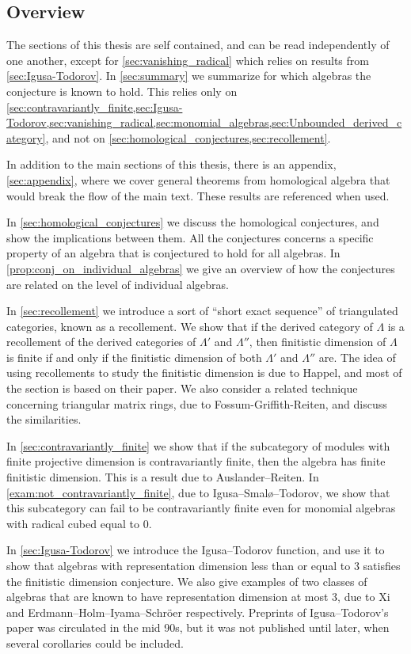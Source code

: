 \subsection*{Overview}
The sections of this thesis are self contained, and can be read independently of one another, except for \cref{sec:vanishing_radical} which relies on results from \cref{sec:Igusa-Todorov}. In \cref{sec:summary} we summarize for which algebras the conjecture is known to hold. This relies only on \cref{sec:contravariantly_finite,sec:Igusa-Todorov,sec:vanishing_radical,sec:monomial_algebras,sec:Unbounded_derived_category}, and not on \cref{sec:homological_conjectures,sec:recollement}.

In addition to the main sections of this thesis, there is an appendix, \cref{sec:appendix}, where we cover general theorems from homological algebra that would break the flow of the main text. These results are referenced when used.

In \cref{sec:homological_conjectures} we discuss the homological conjectures, and show the implications between them. All the conjectures concerns a specific property of an algebra that is conjectured to hold for all algebras. In \cref{prop:conj_on_individual_algebras} we give an overview of how the conjectures are related on the level of individual algebras.

In \cref{sec:recollement} we introduce a sort of ``short exact sequence'' of triangulated categories, known as a recollement. We show that if the derived category of $\Lambda$ is a recollement of the derived categories of $\Lambda'$ and $\Lambda''$, then finitistic dimension of $\Lambda$ is finite if and only if the finitistic dimension of both $\Lambda'$ and $\Lambda''$ are. The idea of using recollements to study the finitistic dimension is due to Happel, and most of the section is based on their paper\cite{Hap93}. We also consider a related technique concerning triangular matrix rings, due to Fossum-Griffith-Reiten\cite{FGR75}, and discuss the similarities.

In \cref{sec:contravariantly_finite} we show that if the subcategory of modules with finite projective dimension is contravariantly finite, then the algebra has finite finitistic dimension. This is a result due to Auslander--Reiten\cite{AR91}. In \cref{exam:not_contravariantly_finite}, due to Igusa--Smalø--Todorov\cite{IST90}, we show that this subcategory can fail to be contravariantly finite even for monomial algebras with radical cubed equal to 0. 

In \cref{sec:Igusa-Todorov} we introduce the Igusa--Todorov function, and use it to show that algebras with representation dimension less than or equal to 3 satisfies the finitistic dimension conjecture. We also give examples of two classes of algebras that are known to have representation dimension at most 3, due to Xi and Erdmann--Holm--Iyama--Schröer respectively\cite{Xi02,EHIS04}. Preprints of Igusa--Todorov's paper\cite{IgTo05} was circulated in the mid 90s, but it was not published until later, when several corollaries could be included.

